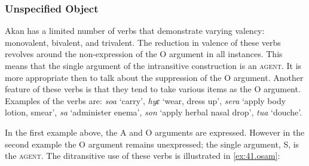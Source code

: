 \documentclass[output=paper]{langsci/langscibook}
\begin{document}
\subsubsection{Unspecified Object}\label{§4.5.2:unspecified.osam}

Akan has a limited number of verbs that demonstrate varying valency: monovalent, bivalent, and trivalent. The reduction in valence of these verbs revolves around the non-expression of the O argument in all instances. This means that the single argument of the intransitive construction is an \textsc{agent}. It is more appropriate then to talk about the suppression of the O argument. Another feature of these verbs is that they tend to take various items as the O argument. Examples of the verbs are: \textit{soa} `carry', \textit{hyɛ} `wear, dress up', \textit{sera} `apply body lotion, smear', \textit{sa} `administer enema', \textit{son} `apply herbal nasal drop', \textit{tua} `douche'.


\ea
\label{ex:40.osam}
	\z

	\z
\z

In the first example above, the A and O arguments are expressed. However in the second example the O argument remains unexpressed; the single argument, S, is the \textsc{agent}. The ditransitive use of these verbs is illustrated in \ref{ex:41.osam}:


\ea
\label{ex:41.osam}
	\z

	\z
\z
\end{document}
